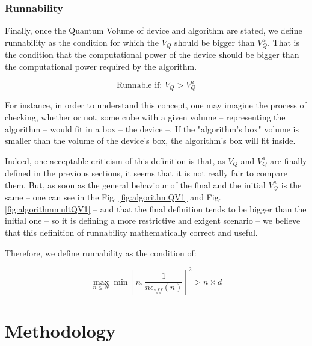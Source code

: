 \documentclass[11pt]{article}
\begin{document}
\subsubsection{Runnability}
\label{sec:org3223312}

Finally, once the Quantum Volume of device and algorithm are stated, we define runnability as the condition for which the \(V_Q\) should be bigger than \(V^a_Q\).
That is the condition that the computational power of the device should be bigger than the computational power required by the algorithm.

$$\text{Runnable if: } V_Q > V^a_Q$$

For instance, in order to understand this concept, one may imagine the process of checking, whether or not, some cube with a given volume -- representing the algorithm -- would fit in a box -- the device --.
If the "algorithm's box" volume is smaller than the volume of the device's box, the algorithm's box will fit inside.

Indeed, one acceptable criticism of this definition is that, as \(V_Q\) and \(V^a_Q\) are finally defined in the previous sections, it seems that it is not really fair to compare them.
But, as soon as the general behaviour of the final and the initial \(V^a_Q\) is the same -- one can see in the Fig. \ref{fig:algorithmQV1} and Fig. \ref{fig:algorithmmultQV1} -- and that the final definition tends to be bigger than the initial one -- so it is defining a more restrictive and exigent scenario -- we believe that this definition of runnability mathematically correct and useful.

Therefore, we define runnability as the condition of:

$$\max_{n \le N} \min \left[ n,\frac{1}{n \epsilon_{eff} (n)}\right]^2 > n \times d$$

\section{Methodology}
\label{sec:orgeb3a4eb}



\end{document}
